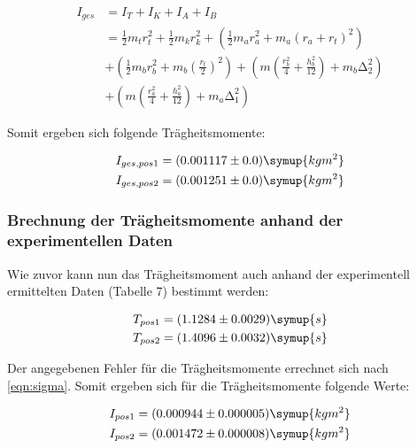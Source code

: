 \begin{align}
  I_{ges} &= I_T + I_K + I_A + I_B\\
          &= \frac{1}{2} m_t r_t^2 + \frac{1}{2} m_k r_k^2 + (\frac{1}{2} m_a r_a^2 + m_a (r_a + r_t)^2) \\
          &+ (\frac{1}{2} m_b r_b^2 + m_b (\frac{r_t}{2})^2) + (m(\frac{r_b^2}{4} + \frac{h_b^2}{12}) + m_b\increment_2^2) \\
          &+ (m(\frac{r_a^2}{4} + \frac{h_a^2}{12}) + m_a\increment_1^2)
\end{align}

Somit ergeben sich folgende Trägheitsmomente:

\begin{align}
  I_{ges,pos1} = (0.001117 \pm 0.0) \symup{kg m^2} \\
  I_{ges,pos2} = (0.001251 \pm 0.0) \symup{kg m^2}
\end{align}

\subsubsection{Brechnung der Trägheitsmomente anhand der experimentellen Daten}

Wie zuvor kann nun das Trägheitsmoment auch anhand der experimentell ermittelten Daten (Tabelle 7) bestimmt
werden:

\begin{align}
  T_{pos1} &= (1.1284 \pm 0.0029) \symup{s} \\
  T_{pos2} &= (1.4096 \pm 0.0032) \symup{s}
\end{align}

Der angegebenen Fehler für die Trägheitsmomente errechnet sich nach \eqref{eqn:sigma}.
Somit ergeben sich für die Trägheitsmomente folgende Werte:

\begin{align}
  I_{pos1} &= (0.000944 \pm 0.000005) \symup{kg m^2} \\
  I_{pos2} &= (0.001472 \pm 0.000008) \symup{kg m^2}
\end{align}

